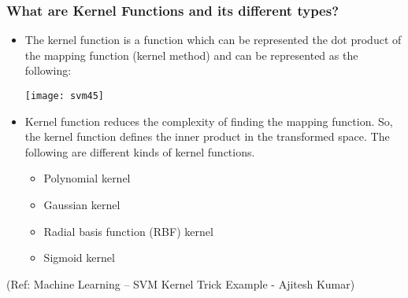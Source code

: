 \begin{frame}[fragile] \frametitle{What are Kernel Functions and its different types?}

\begin{itemize}
\item The kernel function is a function which can be represented the dot product of the mapping function (kernel method) and can be represented as the following:

\begin{center}
\texttt{[image: svm45]}

\end{center}

\item Kernel function reduces the complexity of finding the mapping function. So, the kernel function defines the inner product in the transformed space. The following are different kinds of kernel functions. 

\begin{itemize}

\item Polynomial kernel
\item Gaussian kernel
\item Radial basis function (RBF) kernel
\item Sigmoid kernel
\end{itemize}
\end{itemize}




{\tiny (Ref: Machine Learning – SVM Kernel Trick Example - Ajitesh Kumar)}
\end{frame}






